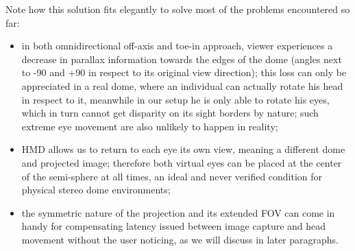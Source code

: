 Note how this solution fits elegantly to solve most of the problems encountered so far:
\begin{itemize}
\item in both omnidirectional off-axis and toe-in approach, viewer experiences a decrease in parallax information towards the edges of the dome (angles next to -90 and +90 in respect to its original view direction); this loss can only be appreciated in a real dome, where an individual can actually rotate his head in respect to it, meanwhile in our setup he is only able to rotate his eyes, which in turn cannot get disparity on its sight borders by nature; such extreme eye movement are also unlikely to happen in reality;
\item HMD allows us to return to each eye its own view, meaning a different dome and projected image; therefore both virtual eyes can be placed at the center of the semi-sphere at all times, an ideal and never verified condition for physical stereo dome environments;
\item the symmetric nature of the projection and its extended FOV can come in handy for compensating latency issued between image capture and head movement without the user noticing, as we will discuss in later paragraphs.
\end{itemize}

